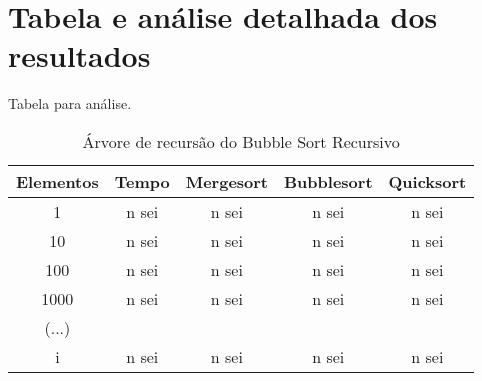 \section{Tabela e análise detalhada dos resultados}
Tabela para análise.
\begin{table}[ht!]
    \centering
    \begin{tabular}{|c|c|c|c|c|}
    \hline
    \textbf{Elementos} & \textbf{Tempo} &\textbf{Mergesort} & \textbf{Bubblesort} & \textbf{Quicksort} \\ \hline
     1 & n sei & n sei & n sei & n sei \\ \hline
     10 & n sei & n sei & n sei & n sei \\ \hline
     100 & n sei & n sei & n sei & n sei \\ \hline
     1000 & n sei & n sei & n sei & n sei \\ \hline
     (...) & & & & \\ \hline
     i & n sei & n sei & n sei & n sei \\ \hline 
    \end{tabular}  
    \caption{Árvore de recursão do Bubble Sort Recursivo}
\end{table}